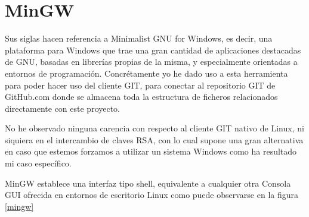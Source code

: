 \section*{MinGW}

Sus siglas hacen referencia a Minimalist GNU for Windows, es decir, una plataforma para Windows que trae una gran cantidad de aplicaciones destacadas de GNU, basadas en librerías propias de la misma, y especialmente orientadas a entornos de programación. Concrétamente yo he dado uso a esta herramienta para poder hacer uso del cliente GIT, para conectar al repositorio GIT de GitHub.com donde se almacena toda la estructura de ficheros relacionados directamente con este proyecto.

No he observado ninguna carencia con respecto al cliente GIT nativo de Linux, ni siquiera en el intercambio de claves RSA, con lo cual supone una gran alternativa en caso que estemos forzamos a utilizar un sistema Windows como ha resultado mi caso específico.

MinGW establece una interfaz tipo shell, equivalente a cualquier otra Consola GUI ofrecida en entornos de escritorio Linux como puede observarse en la figura \ref{mingw}


